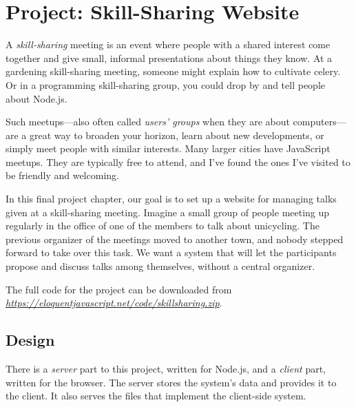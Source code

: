 \chapter{Project: Skill-Sharing Website}\label{skillsharing}


A \emph{skill-sharing} meeting is an event where people with a shared interest come together and give small, informal presentations about things they know. At a gardening skill-sharing meeting, someone might explain how to cultivate celery. Or in a programming skill-sharing group, you could drop by and tell people about Node.js.

Such meetups—also often called \emph{users' groups} when they are about computers—are a great way to broaden your horizon, learn about new developments, or simply meet people with similar interests. Many larger cities have JavaScript meetups. They are typically free to attend, and I've found the ones I've visited to be friendly and welcoming.

In this final project chapter, our goal is to set up a website for managing talks given at a skill-sharing meeting. Imagine a small group of people meeting up regularly in the office of one of the members to talk about unicycling. The previous organizer of the meetings moved to another town, and nobody stepped forward to take over this task. We want a system that will let the participants propose and discuss talks among themselves, without a central organizer.

 The full code for the project can be downloaded from \href{https://eloquentjavascript.net/code/skillsharing.zip}{\emph{https://eloquentjavascript.net\slash code\slash skillsharing.zip}}.

\section{Design}

There is a \emph{server} part to this project, written for Node.js, and a \emph{client} part, written for the browser. The server stores the system's data and provides it to the client. It also serves the files that implement the client-side system.

